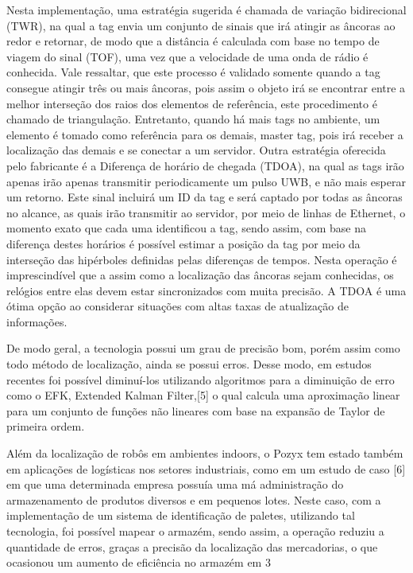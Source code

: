 Nesta implementação, uma estratégia sugerida é chamada de variação bidirecional (TWR), na qual a tag envia um conjunto de sinais que irá atingir as âncoras ao redor e retornar,  de modo que a distância é calculada com base no tempo de viagem do sinal (TOF), uma vez que a velocidade de uma onda de rádio é conhecida. Vale ressaltar, que este processo é validado somente quando a tag consegue atingir três ou mais âncoras, pois assim o objeto irá se encontrar entre a melhor interseção dos raios dos elementos de referência, este procedimento é chamado de triangulação. Entretanto, quando há mais tags no ambiente, um elemento é tomado como referência para os demais, master tag, pois irá receber a localização das demais e se conectar a um servidor. Outra estratégia oferecida pelo fabricante é a Diferença de horário de chegada (TDOA), na qual as tags irão apenas irão apenas transmitir periodicamente um pulso UWB, e não mais esperar um retorno. Este sinal incluirá um ID da tag e será captado por todas as âncoras no alcance, as quais irão transmitir ao servidor, por meio de linhas de Ethernet, o momento exato que cada uma identificou a tag, sendo assim, com base na diferença destes horários  é possível estimar a posição da tag por meio da interseção das hipérboles definidas pelas diferenças de tempos. Nesta operação é imprescindível que a assim como a localização das âncoras sejam conhecidas, os relógios entre elas devem estar sincronizados com muita precisão. A TDOA é uma ótima opção ao considerar situações com altas taxas de atualização de informações. 

De modo geral, a tecnologia possui um grau de precisão bom, porém assim como todo método de localização, ainda se possui erros. Desse modo, em estudos recentes foi possível diminuí-los utilizando algoritmos para a diminuição de erro como o EFK, Extended Kalman Filter,[5] o qual calcula uma aproximação linear para um conjunto de funções não lineares com base na expansão de Taylor de primeira ordem.

Além da localização de robôs em ambientes indoors, o Pozyx tem estado também em aplicações de logísticas nos setores industriais, como em um estudo de caso [6] em que uma determinada empresa possuía uma má administração do  armazenamento de produtos diversos e em pequenos lotes. Neste caso, com a implementação de um sistema de identificação de paletes, utilizando tal tecnologia, foi possível mapear o armazém, sendo assim, a operação reduziu a quantidade de erros, graças a precisão da localização das mercadorias, o que ocasionou um aumento de eficiência no armazém em 3%

